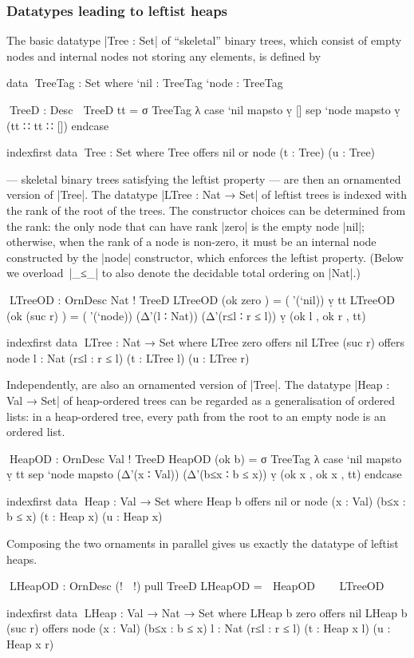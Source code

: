 \subsubsection{Datatypes leading to leftist heaps}

The basic datatype |Tree : Set| of ``skeletal'' binary trees, which consist of empty nodes and internal nodes not storing any elements, is defined by
\begin{code}
data ^^^TreeTag : Set where
  `nil   : TreeTag
  `node  : TreeTag

^^^TreeD : Desc ⊤
TreeD tt = σ TreeTag λ  case  `nil   mapsto  ṿ []
                        sep   `node  mapsto  ṿ (tt ∷ tt ∷ []) endcase

indexfirst data ^^^Tree : Set where
  Tree  offers  nil
        or      node (t : Tree) (u : Tree)
\end{code}
 --- skeletal binary trees satisfying the leftist property --- are then an ornamented version of |Tree|.
The datatype |LTree : Nat → Set| of leftist trees is indexed with the rank of the root of the trees.
The constructor choices can be determined from the rank: the only node that can have rank |zero| is the empty node |nil|; otherwise, when the rank of a node is non-zero, it must be an internal node constructed by the |node| constructor, which enforces the leftist property.
(Below we overload~|_≤_| to also denote the decidable total ordering on |Nat|.)
\begin{code}
^^^LTreeOD : OrnDesc Nat ! TreeD
LTreeOD (ok zero     )   =  (∇'(`nil)) ṿ tt
LTreeOD (ok (suc r)  )   =  (∇'(`node)) (Δ'(l ∶ Nat)) (Δ'(r≤l ∶ r ≤ l)) ṿ (ok l , ok r , tt)

indexfirst data ^^^LTree : Nat → Set where
  LTree zero     offers  nil
  LTree (suc r)  offers  node {l : Nat} (r≤l : r ≤ l) (t : LTree l) (u : LTree r)
\end{code}
Independently,  are also an ornamented version of |Tree|.
The datatype |Heap : Val → Set| of heap-ordered trees can be regarded as a generalisation of ordered lists: in a heap-ordered tree, every path from the root to an empty node is an ordered list.
\begin{code}
^^^HeapOD : OrnDesc Val ! TreeD
HeapOD (ok b) =
  σ TreeTag  λ  case  `nil   mapsto  ṿ tt
                sep   `node  mapsto  (Δ'(x ∶ Val)) (Δ'(b≤x ∶ b ≤ x)) ṿ (ok x , ok x , tt) endcase

indexfirst data ^^^Heap : Val → Set where
  Heap b  offers  nil
          or      node (x : Val) (b≤x : b ≤ x) (t : Heap x) (u : Heap x)
\end{code}
Composing the two ornaments in parallel gives us exactly the datatype of leftist heaps.
\begin{code}
^^^LHeapOD : OrnDesc (! ⋈ !) pull TreeD
LHeapOD = ⌈ HeapOD ⌉ ⊗ ⌈ LTreeOD ⌉

indexfirst data ^^^LHeap : Val → Nat → Set where
  LHeap b zero     offers  nil
  LHeap b (suc r)  offers  node  (x : Val) (b≤x : b ≤ x)
                                 {l : Nat} (r≤l : r ≤ l) (t : Heap x l) (u : Heap x r)
\end{code}

